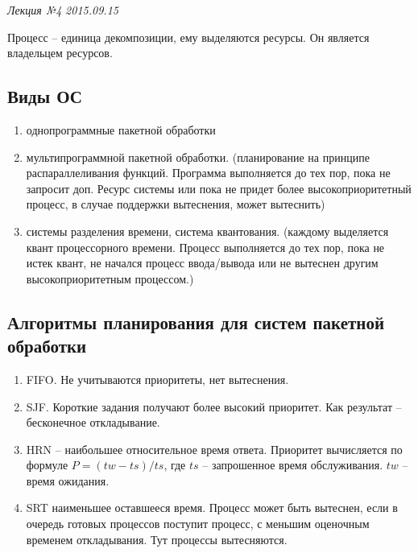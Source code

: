 \clearpage
\begin{flushright}
	\textit{Лекция №4}
	\textit{2015.09.15}
\end{flushright}

Процесс – единица декомпозиции, ему выделяются ресурсы. Он является владельцем ресурсов. 

\subsection{Виды ОС}
\begin{enumerate}
    \item однопрограммные пакетной обработки
    \item мультипрограммной пакетной обработки. (планирование на принципе распараллеливания функций. Программа выполняется до тех пор, пока не запросит доп. Ресурс системы или пока не придет более высокоприоритетный процесс, в случае поддержки вытеснения, может вытеснить)
    \item системы разделения времени, система квантования. (каждому выделяется квант процессорного времени. Процесс выполняется до тех пор, пока не истек квант, не начался процесс ввода/вывода или не вытеснен другим высокоприоритетным процессом.)
\end{enumerate}


\subsection{Алгоритмы планирования для систем пакетной обработки}
\begin{enumerate}
    \item FIFO. Не учитываются приоритеты, нет вытеснения.
    \item SJF. Короткие задания получают более высокий приоритет. Как результат – бесконечное откладывание. 
    \item HRN – наибольшее относительное время ответа. Приоритет вычисляется по формуле $P = (tw - ts) / ts$, где $ts$ – запрошенное время обслуживания. $tw$ – время ожидания.
    \item SRT наименьшее оставшееся время. Процесс может быть вытеснен, если в очередь готовых процессов поступит процесс, с меньшим оценочным временем откладывания. Тут процессы вытесняются.
\end{enumerate}

